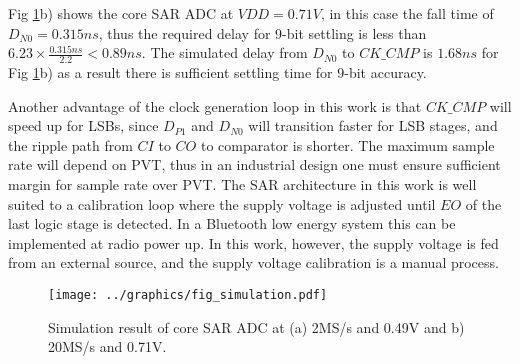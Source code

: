 Fig \ref{fig_sim}b) shows the core SAR ADC at $VDD=0.71V$, in this
case the fall time of $D_{N0} = 0.315ns$, thus the required delay for
9-bit settling is
less than $6.23 \times \frac{0.315ns}{2.2} < 0.89ns$.  The
simulated delay from $D_{N0}$ to $CK\_CMP$ is
$1.68ns$ for Fig \ref{fig_sim}b) as a result there is sufficient
settling time for 9-bit accuracy.

Another advantage of the clock generation loop in this work is that $CK\_CMP$ will
speed up for LSBs, since $D_{P1}$ and $D_{N0}$ will transition faster for
LSB stages, and the ripple path from $CI$ to $CO$ to
comparator is shorter. 
The maximum sample rate will depend on
PVT, thus in an industrial design one must ensure sufficient margin for
sample rate over PVT. The SAR architecture in this work is well suited to a
calibration loop where the supply voltage is adjusted until $EO$ of
the last logic stage is detected. In a Bluetooth\textsuperscript{\textregistered} low energy system this can be implemented at
radio power up. In this work, however, the supply voltage is fed from an
external source, and the supply voltage calibration is a manual
process.  

\begin{figure}[tb]
\centerline{\texttt{[image: ../graphics/fig\_simulation.pdf]}}
\caption{Simulation result of core SAR ADC at (a) 2MS/s and 0.49V and
  b) 20MS/s and 0.71V. }
\label{fig_sim}
\end{figure}
